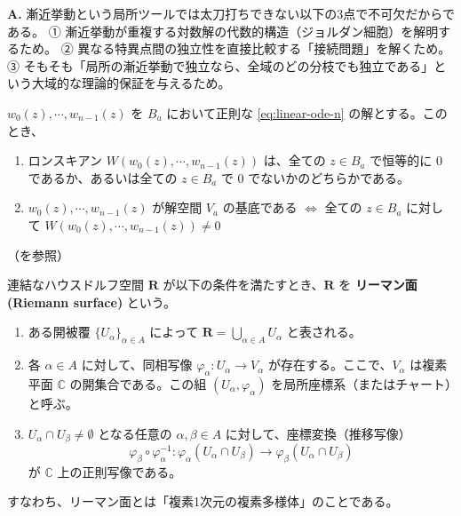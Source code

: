 \begin{Q}
\textbf{A.} 漸近挙動という局所ツールでは太刀打ちできない以下の3点で不可欠だからである。
① 漸近挙動が重複する対数解の代数的構造（ジョルダン細胞）を解明するため。
② 異なる特異点間の独立性を直接比較する「接続問題」を解くため。
③ そもそも「局所の漸近挙動で独立なら、全域のどの分枝でも独立である」という大域的な理論的保証を与えるため。
\end{Q}
\begin{proposition}[アーベルの公式とロンスキアンによる独立性の判定]\label{prop:wronskian_independence}
    $w_{0}(z),\cdots,w_{n-1}(z)$ を $B_{a}$ において正則な \eqref{eq:linear-ode-n} の解とする。このとき、
    \begin{enumerate}
        \item[(i)] ロンスキアン $W(w_{0}(z),\cdots,w_{n-1}(z))$ は、全ての $z\in B_{a}$ で恒等的に $0$ であるか、あるいは全ての $z\in B_{a}$ で $0$ でないかのどちらかである。
        \item[(ii)] $w_{0}(z),\cdots,w_{n-1}(z)$ が解空間 $V_{a}$ の基底である $\iff$ 全ての $z\in B_{a}$ に対して $W(w_{0}(z),\cdots,w_{n-1}(z)) \neq 0$
    \end{enumerate}
    （\cite[p.78 定理11.3]{book:takano}を参照）
\end{proposition}
\begin{definition}[リーマン面]\label{def:riemann_surface}
    連結なハウスドルフ空間 $\mathbf{R}$ が以下の条件を満たすとき、$\mathbf{R}$ を \textbf{リーマン面 (Riemann surface)} という。
    \begin{enumerate}
        \item ある開被覆 $\{U_{\alpha}\}_{\alpha \in A}$ によって $\mathbf{R} = \bigcup_{\alpha \in A} U_{\alpha}$ と表される。
        \item 各 $\alpha \in A$ に対して、同相写像 $\varphi_{\alpha}: U_{\alpha} \to V_{\alpha}$ が存在する。ここで、$V_{\alpha}$ は複素平面 $\mathbb{C}$ の開集合である。この組 $(U_{\alpha}, \varphi_{\alpha})$ を局所座標系（またはチャート）と呼ぶ。
        \item $U_{\alpha} \cap U_{\beta} \neq \emptyset$ となる任意の $\alpha, \beta \in A$ に対して、座標変換（推移写像）
        \[
        \varphi_{\beta} \circ \varphi_{\alpha}^{-1}: \varphi_{\alpha}(U_{\alpha} \cap U_{\beta}) \to \varphi_{\beta}(U_{\alpha} \cap U_{\beta})
        \]
        が $\mathbb{C}$ 上の正則写像である。
    \end{enumerate}
    すなわち、リーマン面とは「複素1次元の複素多様体」のことである。
\end{definition}
